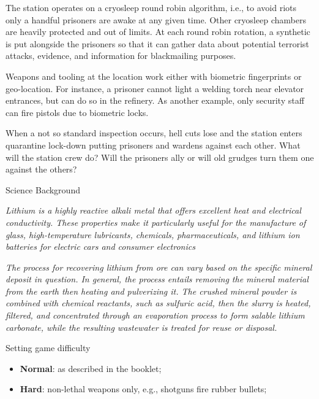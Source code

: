 The station operates on a cryosleep round robin algorithm, i.e., to avoid riots only a handful prisoners are awake at any given time. Other cryosleep chambers are heavily protected and out of limits. At each round robin rotation, a synthetic is put alongside the prisoners so that it can gather data about potential terrorist attacks, evidence, and information for blackmailing purposes.


Weapons and tooling at the location work either with biometric fingerprints or geo-location. For instance, a prisoner cannot light a welding torch near elevator entrances, but can do so in the refinery. As another example, only security staff can fire pistols due to biometric locks.


When a not so standard inspection occurs, hell cuts lose and the station enters quarantine lock-down putting prisoners and wardens against each other.
What will the station crew do? Will the prisoners ally or will old grudges turn them one against the others? 





\medskip
\begin{rpg-commentbox}{Science Background}
\begin{small}
\textit{Lithium is a highly reactive alkali metal that offers excellent heat and electrical conductivity.  These properties make it particularly useful for the manufacture of glass, high-temperature lubricants, chemicals, pharmaceuticals, and lithium ion batteries for electric cars and consumer electronics}

\textit{The process for recovering lithium from ore can vary based on the specific mineral deposit in question. In general, the process entails removing the mineral material from the earth then heating and pulverizing it. The crushed mineral powder is combined with chemical reactants, such as sulfuric acid, then the slurry is heated, filtered, and concentrated through an evaporation process to form salable lithium carbonate, while the resulting wastewater is treated for reuse or disposal.}    
\end{small}
\end{rpg-commentbox}



\medskip
\begin{rpg-commentbox}{Setting game difficulty}
\begin{itemize}
    \item \textbf{Normal}: as described in the booklet;
    \item \textbf{Hard}: non-lethal weapons only, e.g., shotguns fire rubber bullets;
\end{itemize}
\end{rpg-commentbox}

